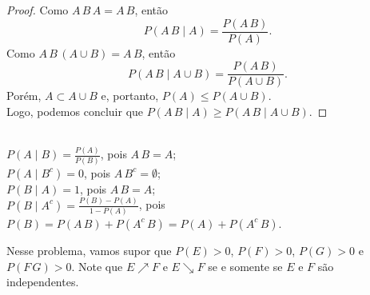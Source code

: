 \begin{questions}
\begin{solution}
\begin{proof}
	Como $A\,B\,A = A\,B$, então
	\[P(A\,B\mid A) = \dfrac{P(A\,B)}{P(A)}.\]
    Como $A\,B\,(A\cup B) = A\,B$, então
    \[P(A\,B\mid A\cup B) = \dfrac{P(A\,B)}{P(A\cup B)}.\]
    Porém, $A \subset A\cup B$ e, portanto, $P(A) \le P(A\cup B)$.\\
    Logo, podemos concluir que $P(A\,B\mid A) \ge P(A\,B\mid A\cup B)$.
\end{proof}
\end{solution}

 \vspace{-10mm}
\begin{solution}
	~\\[1ex]
	$P(A\mid B) = \frac{P(A)}{P(B)}$, pois $A\,B = A$;\\[1ex]
    $P(A\mid B^c) = 0$, pois $A\,B^c = \emptyset$;\\[1ex]
    $P(B\mid A) = 1$, pois $A\,B = A$;\\[1ex]
    $P(B\mid A^c) = \frac{P(B)-P(A)}{1-P(A)}$,
    	pois $P(B) = P(A\,B)+P(A^c\,B) = P(A)+P(A^c\,B)$.
\end{solution}

\setcounter{question}{4}
\begin{solution}
Nesse problema, vamos supor que $P(E)>0$, $P(F)>0$, $P(G)>0$ e $P(F\,G)>0$. Note que $E\nearrow F$ e $E\searrow F$ se e somente se $E$ e $F$ são independentes.
\begin{parts}

\end{parts}
\end{solution}
\end{questions}
